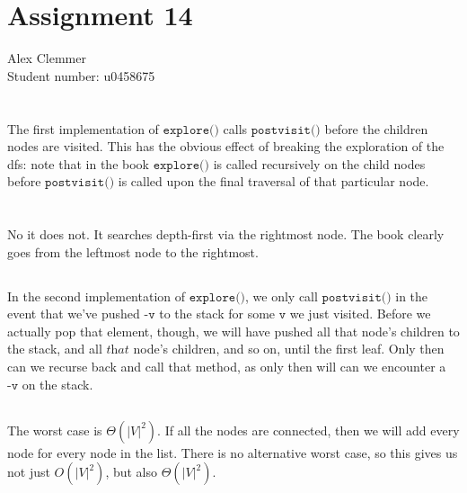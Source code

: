 \documentclass[a4paper]{article}
\begin{document}
\section*{Assignment 14}
Alex Clemmer\\
Student number: u0458675

\section{}
\subsection{}

The first implementation of $\texttt{explore()}$ calls $\texttt{postvisit()}$ before the children nodes are visited. This has the obvious effect of breaking the exploration of the dfs: note that in the book $\texttt{explore()}$ is called recursively on the child nodes before $\texttt{postvisit()}$ is called upon the final traversal of that particular node.

\section{}
\subsection{}

No it does not. It searches depth-first via the rightmost node. The book clearly goes from the leftmost node to the rightmost.

\subsection{}

In the second implementation of $\texttt{explore()}$, we only call $\texttt{postvisit()}$ in the event that we've pushed $\texttt{-v}$ to the stack for some $\texttt{v}$ we just visited. Before we actually pop that element, though, we will have pushed all that node's children to the stack, and all $\textit{that}$ node's children, and so on, until the first leaf. Only then can we recurse back and call that method, as only then will can we encounter a $\texttt{-v}$ on the stack.

\subsection{}

The worst case is $\Theta(|V|^2)$. If all the nodes are connected, then we will add every node for every node in the list. There is no alternative worst case, so this gives us not just $O(|V|^2)$, but also $\Theta(|V|^2)$.
\end{document}
